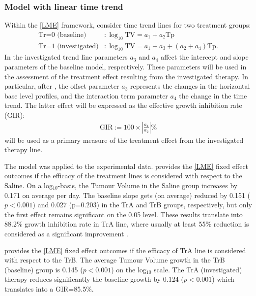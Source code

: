 \subsubsection{Model with linear time trend}
Within the \cref{LME} framework, consider time trend lines for two treatment groups:
\begin{align*}
	\text{Tr=0 (baseline)}&:\log_{10}\text{TV} = a_{1} + a_{2}\text{Tp} \\
	\text{Tr=1 (investigated)}&:\log_{10}\text{TV} = a_{1} + a_{3} + (a_{2}+ a_{4})\text{Tp}.
\end{align*}
In the investigated trend line parameters $a_{3}$ and $a_{4}$ affect the intercept and slope parameters of the baseline model, respectively.
These parameters will be used in the assessment of the treatment effect resulting from the investigated therapy.
In particular, after \autocite{Laajala:2012kr}, the offset parameter $a_{3}$ represents the changes in the horizontal base level profiles, and the interaction term parameter $a_{4}$ the change in the time trend.
The latter effect will be expressed as the effective growth inhibition rate (GIR):
\begin{align}
	\text{GIR}:= 100 \times \left|\frac{a_{4}}{a_{2}}\right| \%
\end{align}
will be used as a primary measure of the treatment effect from the investigated therapy line.


The model was applied to the experimental data.
 provides the \cref{LME} fixed effect outcomes if the efficacy of the treatment lines is considered with respect to the Saline.
On a log$_{10}$-basis, the Tumour Volume in the Saline group increases by 0.171 on average per day.
The baseline slope gets (on average) reduced by 0.151 ($p<0.001$) and 0.027 (p=0.203) in the TrA and TrB groups, respectively, but only the first effect remains significant on the 0.05 level.
These results translate into 88.2\% growth inhibition rate in TrA line, where usually at least 55\% reduction is considered as a significant improvement \autocite{Cheng:2010bp}.

 provides the \cref{LME} fixed effect outcomes if the efficacy of TrA line is considered with respect to the TrB.
The average Tumour Volume growth in the TrB (baseline) group is 0.145 ($p<0.001$) on the log$_{10}$ scale.
The TrA (investigated) therapy reduces significantly the baseline growth by 0.124 ($p<0.001$) which translates into a GIR=85.5\%.

